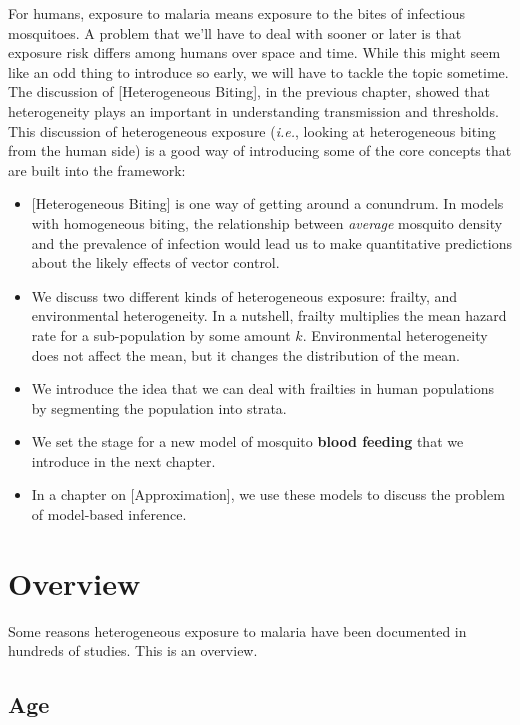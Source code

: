 \documentclass[
]{book}
\begin{document}
For humans, exposure to malaria means exposure to the bites of infectious mosquitoes. A problem that we'll have to deal with sooner or later is that exposure risk differs among humans over space and time. While this might seem like an odd thing to introduce so early, we will have to tackle the topic sometime. The discussion of {[}Heterogeneous Biting{]}, in the previous chapter, showed that heterogeneity plays an important in understanding transmission and thresholds. This discussion of heterogeneous exposure (\emph{i.e.}, looking at heterogeneous biting from the human side) is a good way of introducing some of the core concepts that are built into the framework:

\begin{itemize}
\item
  {[}Heterogeneous Biting{]} is one way of getting around a conundrum. In models with homogeneous biting, the relationship between \emph{average} mosquito density and the prevalence of infection would lead us to make quantitative predictions about the likely effects of vector control.
\item
  We discuss two different kinds of heterogeneous exposure: frailty, and environmental heterogeneity. In a nutshell, frailty multiplies the mean hazard rate for a sub-population by some amount \(k\). Environmental heterogeneity does not affect the mean, but it changes the distribution of the mean.
\item
  We introduce the idea that we can deal with frailties in human populations by segmenting the population into strata.
\item
  We set the stage for a new model of mosquito \textbf{blood feeding} that we introduce in the next chapter.
\item
  In a chapter on {[}Approximation{]}, we use these models to discuss the problem of model-based inference.
\end{itemize}

\hypertarget{overview}{%
\section{Overview}\label{overview}}

Some reasons heterogeneous exposure to malaria have been documented in hundreds of studies. This is an overview.

\hypertarget{age-1}{%
\subsection{Age}\label{age-1}}
\end{document}

